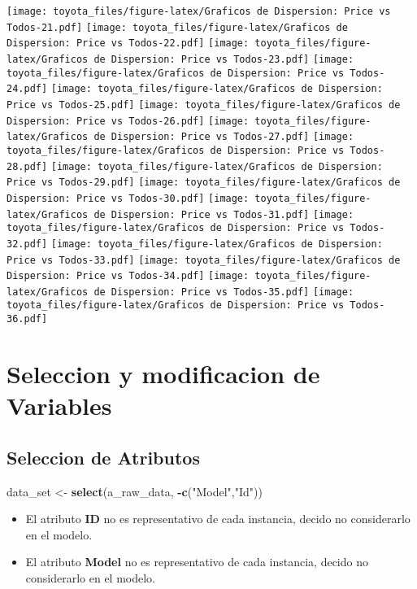 \documentclass[]{article}
\newenvironment{Shaded}{\begin{snugshade}}{\end{snugshade}}
\newcommand{\KeywordTok}[1]{\textcolor[rgb]{0.13,0.29,0.53}{\textbf{#1}}}
\newcommand{\NormalTok}[1]{#1}
\newcommand{\OperatorTok}[1]{\textcolor[rgb]{0.81,0.36,0.00}{\textbf{#1}}}
\newcommand{\StringTok}[1]{\textcolor[rgb]{0.31,0.60,0.02}{#1}}
\providecommand{\tightlist}{%
  \setlength{\itemsep}{0pt}\setlength{\parskip}{0pt}}
\begin{document}
\texttt{[image: toyota\_files/figure-latex/Graficos de Dispersion: Price vs Todos-21.pdf]}
\texttt{[image: toyota\_files/figure-latex/Graficos de Dispersion: Price vs Todos-22.pdf]}
\texttt{[image: toyota\_files/figure-latex/Graficos de Dispersion: Price vs Todos-23.pdf]}
\texttt{[image: toyota\_files/figure-latex/Graficos de Dispersion: Price vs Todos-24.pdf]}
\texttt{[image: toyota\_files/figure-latex/Graficos de Dispersion: Price vs Todos-25.pdf]}
\texttt{[image: toyota\_files/figure-latex/Graficos de Dispersion: Price vs Todos-26.pdf]}
\texttt{[image: toyota\_files/figure-latex/Graficos de Dispersion: Price vs Todos-27.pdf]}
\texttt{[image: toyota\_files/figure-latex/Graficos de Dispersion: Price vs Todos-28.pdf]}
\texttt{[image: toyota\_files/figure-latex/Graficos de Dispersion: Price vs Todos-29.pdf]}
\texttt{[image: toyota\_files/figure-latex/Graficos de Dispersion: Price vs Todos-30.pdf]}
\texttt{[image: toyota\_files/figure-latex/Graficos de Dispersion: Price vs Todos-31.pdf]}
\texttt{[image: toyota\_files/figure-latex/Graficos de Dispersion: Price vs Todos-32.pdf]}
\texttt{[image: toyota\_files/figure-latex/Graficos de Dispersion: Price vs Todos-33.pdf]}
\texttt{[image: toyota\_files/figure-latex/Graficos de Dispersion: Price vs Todos-34.pdf]}
\texttt{[image: toyota\_files/figure-latex/Graficos de Dispersion: Price vs Todos-35.pdf]}
\texttt{[image: toyota\_files/figure-latex/Graficos de Dispersion: Price vs Todos-36.pdf]}

\hypertarget{seleccion-y-modificacion-de-variables}{%
\section{Seleccion y modificacion de
Variables}\label{seleccion-y-modificacion-de-variables}}

\hypertarget{seleccion-de-atributos}{%
\subsection{Seleccion de Atributos}\label{seleccion-de-atributos}}

\begin{Shaded}
\begin{Highlighting}[]
\NormalTok{data_set <-}\StringTok{ }\KeywordTok{select}\NormalTok{(a_raw_data, }\OperatorTok{-}\KeywordTok{c}\NormalTok{(}\StringTok{"Model"}\NormalTok{,}\StringTok{"Id"}\NormalTok{))}
\end{Highlighting}
\end{Shaded}

\begin{itemize}
\tightlist
\item
  El atributo \textbf{ID} no es representativo de cada instancia, decido
  no considerarlo en el modelo.\\
\item
  El atributo \textbf{Model} no es representativo de cada instancia,
  decido no considerarlo en el modelo.
\end{itemize}
\end{document}
